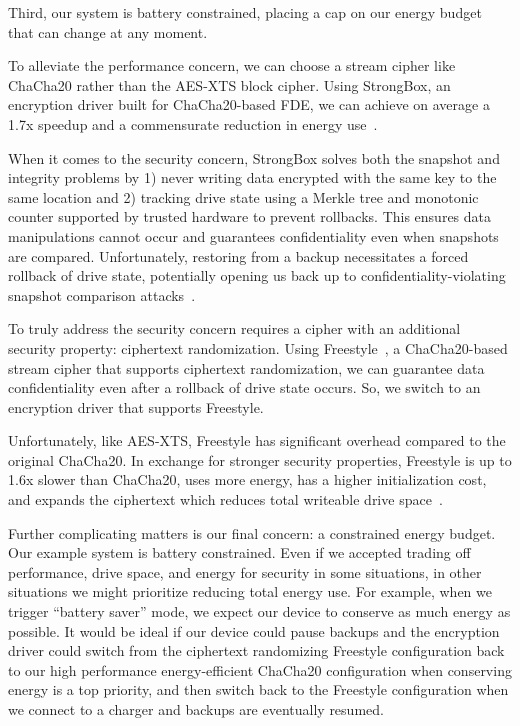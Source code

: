 Third, our system is battery constrained, placing a cap on our energy budget
that can change at any moment.

To alleviate the performance concern, we can choose a stream cipher like
ChaCha20 rather than the AES-XTS block cipher. Using StrongBox, an encryption
driver built for ChaCha20-based FDE, we can achieve on average a 1.7x speedup
and a commensurate reduction in energy use~\cite{StrongBox}.

When it comes to the security concern, StrongBox solves both the snapshot and
integrity problems by 1) never writing data encrypted with the same key to the
same location and 2) tracking drive state using a Merkle tree and monotonic
counter supported by trusted hardware to prevent rollbacks. This ensures data
manipulations cannot occur and guarantees confidentiality even when snapshots
are compared. Unfortunately, restoring from a backup necessitates a forced
rollback of drive state, potentially opening us back up to
confidentiality-violating snapshot comparison attacks~\cite{StrongBox}.

To truly address the security concern requires a cipher with an additional
security property: ciphertext randomization. Using Freestyle~\cite{Freestyle}, a
ChaCha20-based stream cipher that supports ciphertext randomization, we can
guarantee data confidentiality even after a rollback of drive state occurs. So,
we switch to an encryption driver that supports Freestyle.

Unfortunately, like AES-XTS, Freestyle has significant overhead compared to the
original ChaCha20. In exchange for stronger security properties, Freestyle is up
to 1.6x slower than ChaCha20, uses more energy, has a higher initialization
cost, and expands the ciphertext which reduces total writeable drive
space~\cite{Freestyle}.

Further complicating matters is our final concern: a constrained energy budget.
Our example system is battery constrained. Even if we accepted trading off
performance, drive space, and energy for security in some situations, in other
situations we might prioritize reducing total energy use. For example, when we
trigger ``battery saver'' mode, we expect our device to conserve as much energy
as possible. It would be ideal if our device could pause backups and the
encryption driver could switch from the ciphertext randomizing Freestyle
configuration back to our high performance energy-efficient ChaCha20
configuration when conserving energy is a top priority, and then switch back to
the Freestyle configuration when we connect to a charger and backups are
eventually resumed.

